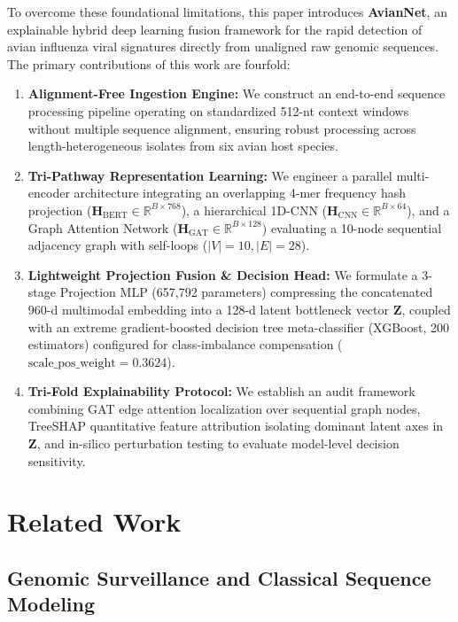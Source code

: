 \documentclass[conference]{IEEEtran}
\begin{document}
To overcome these foundational limitations, this paper introduces \textbf{AvianNet}, an explainable hybrid deep learning fusion framework for the rapid detection of avian influenza viral signatures directly from unaligned raw genomic sequences. The primary contributions of this work are fourfold:
\begin{enumerate}
    \item \textbf{Alignment-Free Ingestion Engine:} We construct an end-to-end sequence processing pipeline operating on standardized 512-nt context windows without multiple sequence alignment, ensuring robust processing across length-heterogeneous isolates from six avian host species.
    \item \textbf{Tri-Pathway Representation Learning:} We engineer a parallel multi-encoder architecture integrating an overlapping 4-mer frequency hash projection ($\mathbf{H}_{\text{BERT}} \in \mathbb{R}^{B \times 768}$), a hierarchical 1D-CNN ($\mathbf{H}_{\text{CNN}} \in \mathbb{R}^{B \times 64}$), and a Graph Attention Network ($\mathbf{H}_{\text{GAT}} \in \mathbb{R}^{B \times 128}$) evaluating a 10-node sequential adjacency graph with self-loops ($|V|=10, |E|=28$).
    \item \textbf{Lightweight Projection Fusion \& Decision Head:} We formulate a 3-stage Projection MLP (657,792 parameters) compressing the concatenated 960-d multimodal embedding into a 128-d latent bottleneck vector $\mathbf{Z}$, coupled with an extreme gradient-boosted decision tree meta-classifier (XGBoost, 200 estimators) configured for class-imbalance compensation ($\text{scale\_pos\_weight} = 0.3624$).
    \item \textbf{Tri-Fold Explainability Protocol:} We establish an audit framework combining GAT edge attention localization over sequential graph nodes, TreeSHAP quantitative feature attribution isolating dominant latent axes in $\mathbf{Z}$, and in-silico perturbation testing to evaluate model-level decision sensitivity.
\end{enumerate}

\section{Related Work}
\label{sec:related_work}

\subsection{Genomic Surveillance and Classical Sequence Modeling}
\end{document}
